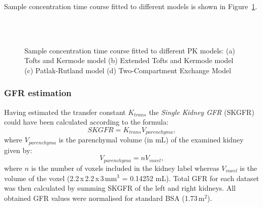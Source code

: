 Sample concentration time course fitted to different models is shown in Figure~\ref{fig:fit}. 

\begin{figure}
\captionsetup[subfloat]{captionskip=0.5cm}
	\centering
	\subfloat[TK model fit; $K_{trans}$ = 0.64 min$^{-1}$ ]{\texttt{[image: tk2]}}\hspace{0.03\linewidth}
	\\ \vspace{0.5cm}	
	\subfloat[PR model fit; $K_{trans}$ = 0.22 min$^{-1}$]{\texttt{[image: pr2]}}\hspace{0.03\linewidth}
	\\	
\vspace{0.5cm}
\caption[An example of models fit]{Sample concentration time course fitted to different PK models: (a) Tofts and Kermode model (b) Extended Tofts and Kermode model (c) Patlak-Rutland model (d) Two-Compartment Exchange Model}
\label{fig:fit}
\end{figure}

\subsubsection{GFR estimation}
Having estimated the transfer constant $K_{trans}$ the \textit{Single Kidney GFR} (SKGFR) could have been calculated according to the formula:
\begin{equation}
SKGFR = K_{trans}V_{parenchyma},
\end{equation}
where $V_{parenchyma}$ is the parenchymal volume (in mL) of the examined kidney given by:
\begin{equation}
V_{parenchyma} = nV_{voxel},
\end{equation}
where $n$ is the number of voxels included in the kidney label whereas $V_{voxel}$ is the volume of the voxel (2.2\,x\,2.2\,x\,3\,mm$^3$ = 0.14252 mL). Total GFR for each dataset was then calculated by summing SKGFR of the left and right kidneys. All obtained GFR values were normalised for standard BSA (1.73\,m$^2$).
